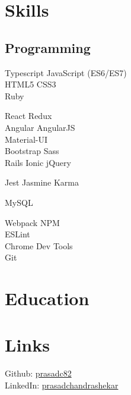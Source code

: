 \documentclass[]{my-resume-openfont}
\begin{document}
\begin{minipage}[t]{0.33\textwidth} 


\section{Skills}
\subsection{Programming}

Typescript \textbullet{} JavaScript (ES6/ES7) \\
HTML5 \textbullet{} CSS3 \\
Ruby
\sectionsep

React \textbullet{} Redux \\
Angular \textbullet{} AngularJS \\
Material-UI \\
Bootstrap \textbullet{} Sass \\
Rails \textbullet{} Ionic \textbullet{} jQuery
\sectionsep

Jest \textbullet{} Jasmine \textbullet{} Karma
\sectionsep

MySQL 
\sectionsep

Webpack \textbullet{} NPM \\
ESLint  \\
Chrome Dev Tools  \\
Git
\sectionsep



\section{Education}

\sectionsep


\section{Links}
Github: \href{https://github.com/prasadc82}{prasadc82} \\
LinkedIn: \href{https://www.linkedin.com/in/prasadchandrashekar}{prasadchandrashekar} \\
\sectionsep

%
%

\end{minipage}
\end{document}
